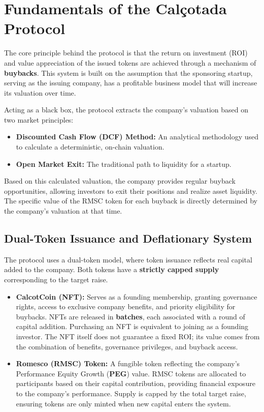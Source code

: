 \documentclass[conference]{IEEEtran}
\begin{document}
\section{Fundamentals of the Calçotada Protocol}

The core principle behind the protocol is that the return on investment (ROI) and value appreciation of the issued tokens are achieved through a mechanism of \textbf{buybacks}. This system is built on the assumption that the sponsoring startup, serving as the issuing company, has a profitable business model that will increase its valuation over time.

Acting as a black box, the protocol extracts the company’s valuation based on two market principles:
\begin{itemize}
\item \textbf{Discounted Cash Flow (DCF) Method:} An analytical methodology used to calculate a deterministic, on-chain valuation.
\item \textbf{Open Market Exit:} The traditional path to liquidity for a startup.
\end{itemize}
Based on this calculated valuation, the company provides regular buyback opportunities, allowing investors to exit their positions and realize asset liquidity. The specific value of the RMSC token for each buyback is directly determined by the company’s valuation at that time.

\subsection{Dual-Token Issuance and Deflationary System}

The protocol uses a dual-token model, where token issuance reflects real capital added to the company. Both tokens have a \textbf{strictly capped supply} corresponding to the target raise.

\begin{itemize}
    \item \textbf{CalcotCoin (NFT):} Serves as a founding membership, granting governance rights, access to exclusive company benefits, and priority eligibility for buybacks. NFTs are released in \textbf{batches}, each associated with a round of capital addition. Purchasing an NFT is equivalent to joining as a founding investor. The NFT itself does not guarantee a fixed ROI; its value comes from the combination of benefits, governance privileges, and buyback access.

    \item \textbf{Romesco (RMSC) Token:} A fungible token reflecting the company’s Performance Equity Growth (\textbf{PEG}) value. RMSC tokens are allocated to participants based on their capital contribution, providing financial exposure to the company’s performance. Supply is capped by the total target raise, ensuring tokens are only minted when new capital enters the system.
\end{itemize}
\end{document}
